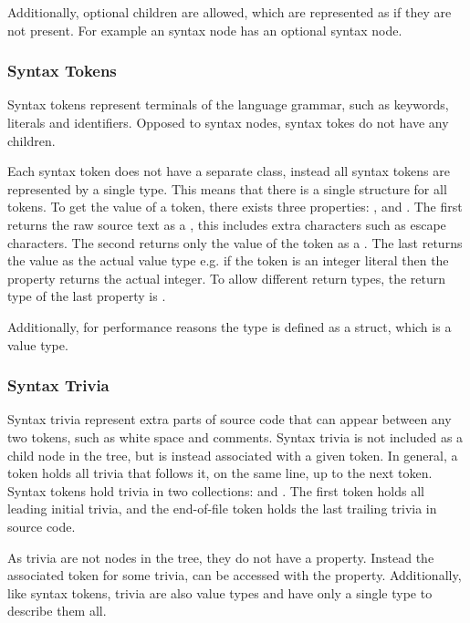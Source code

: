 Additionally, optional children are allowed, which are represented as  if they are not present. For example an  syntax node has an optional  syntax node\cite[p. 7]{ng2012roslyn}.

\subsubsection{Syntax Tokens}
Syntax tokens represent terminals of the language grammar, such as keywords, literals and identifiers. Opposed to syntax nodes, syntax tokes do not have any children. 

Each syntax token does not have a separate class, instead all syntax tokens are represented by a single  type. This means that there is a single structure for all tokens. To get the value of a token, there exists three properties: ,  and . The first returns the raw source text as a , this includes extra characters such as escape characters. The second returns only the value of the token as a . The last returns the value as the actual value type e.g. if the token is an integer literal then the property returns the actual integer. To allow different return types, the return type of the last property is .

Additionally, for performance reasons the  type is defined as a struct, which is a value type\cite[p. 7]{ng2012roslyn}.

\subsubsection{Syntax Trivia}
Syntax trivia represent extra parts of source code that can appear between any two tokens, such as white space and comments. Syntax trivia is not included as a child node in the tree, but is instead associated with a given token. In general, a token holds all trivia that follows it, on the same line, up to the next token. Syntax tokens hold trivia in two collections:  and . The first token holds all leading initial trivia, and the end-of-file token holds the last trailing trivia in source code\cite[p. 8]{ng2012roslyn}.

As trivia are not nodes in the tree, they do not have a  property. Instead the associated token for some trivia, can be accessed with the  property. Additionally, like syntax tokens, trivia are also value types and have only a single  type to describe them all.

